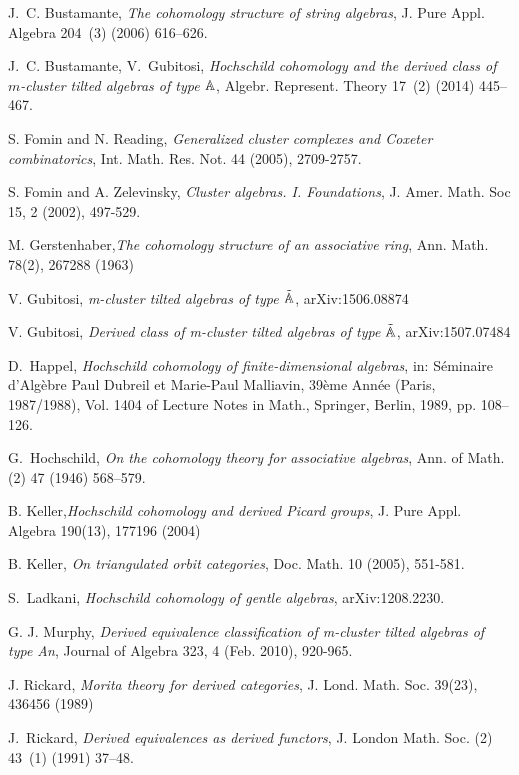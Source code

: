 \documentclass{amsart}
\theoremstyle{plain}
\theoremstyle{definition}
\begin{document}
\begin{thebibliography}{10}
 J.~C. Bustamante, \textit{The cohomology structure of string algebras}, J. Pure Appl. Algebra 204~(3) (2006) 616--626.

 J.~C. Bustamante, V.~Gubitosi, \textit{Hochschild cohomology and the derived class of {$m$}-cluster tilted algebras of type {$\Bbb{A}$}},
  Algebr. Represent. Theory 17~(2) (2014) 445--467.

 S. Fomin and N. Reading,  \textit{Generalized cluster complexes and Coxeter combinatorics}, Int. Math. Res. Not.
44 (2005), 2709-2757.

 S. Fomin and  A. Zelevinsky, \textit{Cluster algebras. I. Foundations}, J. Amer. Math. Soc 15, 2 (2002), 497-529.

  M. Gerstenhaber,\textit{The cohomology structure of an associative ring},  Ann. Math. 78(2), 267288 (1963)

 V. Gubitosi, \textit{m-cluster tilted algebras of type {$\tilde{\Bbb{A}}$}}, arXiv:1506.08874

 V. Gubitosi, \textit{Derived class of m-cluster tilted algebras of type {$\tilde{\Bbb{A}}$}}, arXiv:1507.07484

 D.~Happel, \textit{Hochschild cohomology of finite-dimensional algebras}, in: S\'eminaire d'{A}lg\`ebre {P}aul {D}ubreil
  et {M}arie-{P}aul {M}alliavin, 39\`eme {A}nn\'ee ({P}aris, 1987/1988), Vol. 1404 of Lecture Notes in Math., Springer, Berlin, 1989, pp. 108--126.

 G.~Hochschild, \textit{On the cohomology theory for associative algebras}, Ann. of Math. (2) 47 (1946) 568--579.

 B. Keller,\textit{Hochschild cohomology and derived Picard groups}, J. Pure Appl. Algebra 190(13),
177196 (2004)

 B. Keller,  \textit{On triangulated orbit categories}, Doc. Math. 10 (2005), 551-581.

 S.~Ladkani, \textit{Hochschild cohomology of gentle algebras}, arXiv:1208.2230.

 G. J. Murphy,  \textit{Derived equivalence classification of m-cluster tilted algebras of type An}, Journal of Algebra 323, 4 (Feb. 2010), 920-965.

 J. Rickard, \textit{Morita theory for derived categories}, J. Lond. Math. Soc. 39(23), 436456 (1989)

 J.~Rickard, \textit{Derived equivalences as derived functors}, J. London Math. Soc. (2) 43~(1) (1991) 37--48.


\end{thebibliography}
\end{document}
